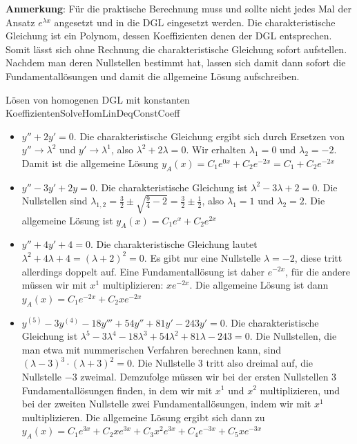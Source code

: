 \textbf{Anmerkung}: Für die praktische Berechnung muss und sollte nicht jedes Mal der Ansatz $e^{\lambda x}$ angesetzt und in die DGL eingesetzt werden. Die charakteristische Gleichung ist ein Polynom, dessen Koeffizienten denen der DGL entsprechen. Somit lässt sich ohne Rechnung die charakteristische Gleichung sofort aufstellen. Nachdem man deren Nullstellen bestimmt hat, lassen sich damit dann sofort die Fundamentallösungen und damit die allgemeine Lösung aufschreiben.

\begin{example}{Lösen von homogenen DGL mit konstanten Koeffizienten}{SolveHomLinDeqConstCoeff}
    \begin{itemize}
        \item $y''+2y'=0$. Die charakteristische Gleichung ergibt sich durch Ersetzen von $y'' \to \lambda^2$ und $y' \to \lambda^1$, also $\lambda^2+2\lambda = 0$. Wir erhalten $\lambda_1 = 0$ und $\lambda_2 = -2$. Damit ist die allgemeine Lösung $y_A(x) = C_1 e^{0x} + C_2 e^{-2x} = C_1 + C_2 e^{-2x}$
        \item $y''-3y'+2y=0$. Die charakteristische Gleichung ist $\lambda^2-3\lambda+2=0$. Die Nullstellen sind $\lambda_{1,2} = \frac{3}{2} \pm \sqrt{\frac{9}{4} - 2} = \frac{3}{2} \pm \frac{1}{2}$, also $\lambda_1 = 1$ und $\lambda_2 = 2$. Die allgemeine Lösung ist $y_A(x) = C_1 e^x + C_2 e^{2x}$
        \item $y''+4y'+4=0$. Die charakteristische Gleichung lautet $\lambda^2+4\lambda+4=(\lambda+2)^2=0$. Es gibt nur eine Nullstelle $\lambda=-2$, diese tritt allerdings doppelt auf. Eine Fundamentallösung ist daher $e^{-2x}$, für die andere müssen wir mit $x^1$ multiplizieren: $xe^{-2x}$. Die allgemeine Lösung ist dann $y_A(x) = C_1 e^{-2x} + C_2 x e^{-2x}$
        \item $y^{(5)}-3y^{(4)}-18y'''+54y''+81y'-243y'=0$. Die charakteristische Gleichung ist $\lambda^5-3\lambda^4-18\lambda^3+54\lambda^2+81\lambda-243 = 0$. Die Nullstellen, die man etwa mit nummerischen Verfahren berechnen kann, sind $(\lambda-3)^3\cdot(\lambda+3)^2 = 0$. Die Nullstelle $3$ tritt also dreimal auf, die Nullstelle $-3$ zweimal. Demzufolge müssen wir bei der ersten Nullstellen 3 Fundamentallösungen finden, in dem wir mit $x^1$ und $x^2$ multiplizieren, und bei der zweiten Nullstelle zwei Fundamentallösungen, indem wir mit $x^1$ multiplizieren. Die allgemeine Lösung ergibt sich dann zu $y_A(x) = C_1 e^{3x} + C_2 x e^{3x} + C_3 x^2 e^{3x} + C_4 e^{-3x} + C_5 x e^{-3x}$

\end{itemize}
\end{example}
